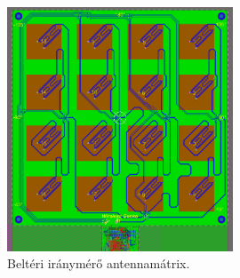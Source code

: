 \documentclass[a4paper,12pt,titlepage]{article}
\begin{document}
%
%
            \begin{figure}
                \centering
                \includegraphics[width=0.6\textwidth]{kep/szerkesztett/antennamatrix.png}
                \caption{Beltéri iránymérő antennamátrix.}
                \label{fig:antennamatrix}
            \end{figure}
%
\end{document}

